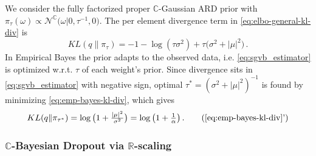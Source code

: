 \documentclass[a4paper,10pt,twocolumn]{article}
\newcommand{\real}{\mathbb{R}}
\newcommand{\cplx}{\mathbb{C}}
\newcommand{\tr}[1]{\mathop{tr}{#1}}
\newcommand{\hop}{{\mkern-1.5mu\dagger}}
\begin{document}
We consider the fully factorized proper $\cplx$-Gaussian ARD prior with $
  \pi_\tau(\omega)
    \propto \mathcal{N}^{\cplx}\bigl(
      \omega \vert 0, \tau^{-1}, 0
    \bigr)
$. The per element divergence term in \eqref{eq:elbo-general-kl-div} is
\begin{equation}  \label{eq:emp-bayes-kl-div}
  KL(q \| \pi_\tau)
    = - 1 - \log{(\tau \sigma^2)}
      + \tau \bigl(
        \sigma^2 + \lvert \mu \rvert^2
      \bigr)
    \,.
\end{equation}
%
%
In Empirical Bayes the prior adapts to the observed data, i.e. \eqref{eq:sgvb_estimator} is optimized
w.r.t. $\tau$ of each weight's prior. Since divergence sits in \eqref{eq:sgvb_estimator} with negative
sign, optimal $
  \tau^\ast = (\sigma^2 + \lvert \mu \rvert^2)^{-1}
$ is found by minimizing \eqref{eq:emp-bayes-kl-div}, which gives
\begin{equation}  \label{eq:emp-bayes-opt-kl}
  KL(q \| \pi_{\tau^\ast})
    = \log{\bigl(1 + \tfrac{\lvert \mu \rvert^2}{\sigma^2}\bigr)}
    = \log{\bigl(1 + \tfrac1\alpha \bigr)}
    \,.
    \tag{\ref{eq:emp-bayes-kl-div}'}
\end{equation}


\subsubsection{$\cplx$-Bayesian Dropout via $\real$-scaling} %
\label{ssub:real_scaling_dropout}
\end{document}
